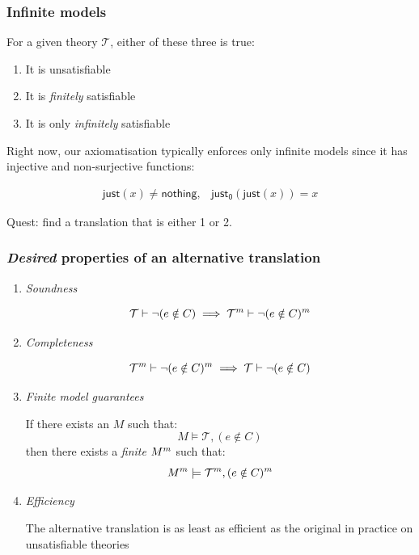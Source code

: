 \documentclass[serif,professionalfont]{beamer}
\begin{document}
\begin{frame}[fragile]
  \frametitle{Infinite models}

  For a given theory $\mathcal{T}$, either of these three is true:

  \begin{enumerate}
    \item It is unsatisfiable

    \item It is \emph{finitely} satisfiable

    \item It is only \emph{infinitely} satisfiable
  \end{enumerate}

  Right now, our axiomatisation typically enforces only infinite
  models since it has injective and non-surjective functions:

  \[\begin{array}{ll}
  \mathsf{just}(x) \neq \mathsf{nothing}, &
  \mathsf{just_0}(\mathsf{just}(x)) = x
  \end{array}\]

  Quest: find a translation that is either 1 or 2.

\end{frame}



\begin{frame}[fragile]
  \frametitle{\emph{Desired} properties of an alternative translation}

  \begin{enumerate}
    \item \emph{Soundness}

      $$\mathcal{T} \vdash \neg (e \notin C) \implies
        \mathcal{T}^{m} \vdash \neg (e \notin C)^{m}$$

    \item \emph{Completeness}

      $$\mathcal{T}^{m} \vdash \neg (e \notin C)^{m} \implies
        \mathcal{T} \vdash \neg (e \notin C)$$

    \item \emph{Finite model guarantees}

      If there exists an $M$ such that:
      $$M \models \mathcal{T} , (e \notin C)$$
      then there exists a \emph{finite} $M^{m}$ such that:
      $$M^{m} \models \mathcal{T}^{m} , (e \notin C)^{m}$$

    \item \emph{Efficiency}

      The alternative translation is as least as efficient as the
      original in practice on unsatisfiable theories
  \end{enumerate}

\end{frame}
\end{document}
